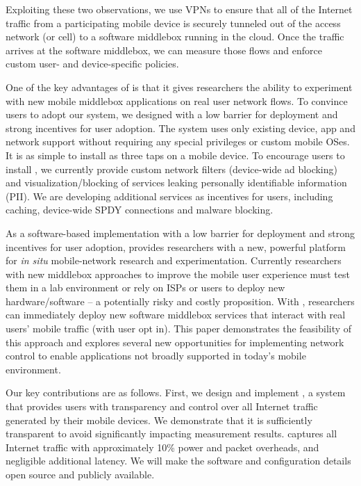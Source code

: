 Exploiting these two observations, we use VPNs to ensure that all of the Internet traffic from a participating mobile device is 
securely tunneled out of the access network (\wifi or cell) to a software middlebox running 
in the cloud. Once the traffic arrives at the software middlebox, we can measure those flows 
and enforce custom user- and device-specific policies. 

One of the key advantages of \meddle is that it gives researchers the ability to experiment 
with new mobile middlebox applications on real user network flows. To convince users to adopt our 
system, we designed \meddle with a low barrier for deployment and strong incentives for 
user adoption. The system uses only existing device, app and network support without requiring 
any special privileges or custom mobile OSes. It is as simple to install as three taps 
on a mobile device. To encourage users to install \meddle, we currently provide custom 
network filters (\eg device-wide ad blocking) and visualization/blocking of services leaking 
personally identifiable information (PII). We are developing additional services as incentives 
for users, including caching, device-wide SPDY connections and malware blocking.

As a software-based implementation with a low barrier for deployment and strong incentives for 
user adoption, \meddle provides researchers with a new, powerful platform for \emph{in situ} 
mobile-network research and experimentation. Currently researchers with new  
middlebox approaches to improve the mobile user experience must test them in a lab environment or 
rely on ISPs or users to deploy new hardware/software -- a potentially risky and costly 
proposition. With \meddle, researchers 
can immediately deploy new software middlebox services that interact with 
real users' mobile traffic (with user opt in). %
This paper demonstrates the feasibility of this approach and explores several new opportunities 
for implementing network control to enable applications not broadly supported in today's mobile environment.

Our key contributions are as follows. First, we design and implement \meddle, a system that provides users with transparency 
and control %
over all Internet traffic generated by their 
mobile devices. We demonstrate that it is sufficiently transparent to avoid significantly impacting measurement results. 
\platname captures all Internet traffic with approximately 10\% power and packet overheads, and negligible additional latency. 
We will make the \platname software and configuration details open source and publicly available.

